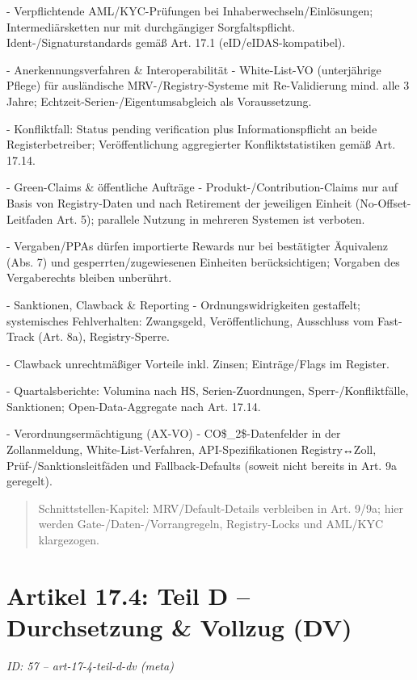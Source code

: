 \documentclass[12pt,a4paper]{scrartcl}
\begin{document}
- Verpflichtende AML/KYC-Prüfungen bei Inhaberwechseln/Einlösungen; Intermediärsketten nur mit durchgängiger Sorgfaltspflicht. Ident-/Signaturstandards gemäß Art. 17.1 (eID/eIDAS-kompatibel).

- Anerkennungsverfahren \& Interoperabilität
- White-List-VO (unterjährige Pflege) für ausländische MRV-/Registry-Systeme mit Re-Validierung mind. alle 3 Jahre; Echtzeit-Serien-/Eigentumsabgleich als Voraussetzung.

- Konfliktfall: Status pending verification plus Informationspflicht an beide Registerbetreiber; Veröffentlichung aggregierter Konfliktstatistiken gemäß Art. 17.14.

- Green-Claims \& öffentliche Aufträge
- Produkt-/Contribution-Claims nur auf Basis von Registry-Daten und nach Retirement der jeweiligen Einheit (No-Offset-Leitfaden Art. 5); parallele Nutzung in mehreren Systemen ist verboten.

- Vergaben/PPAs dürfen importierte Rewards nur bei bestätigter Äquivalenz (Abs. 7) und gesperrten/zugewiesenen Einheiten berücksichtigen; Vorgaben des Vergaberechts bleiben unberührt.

- Sanktionen, Clawback \& Reporting
- Ordnungswidrigkeiten gestaffelt; systemisches Fehlverhalten: Zwangsgeld, Veröffentlichung, Ausschluss vom Fast-Track (Art. 8a), Registry-Sperre.

- Clawback unrechtmäßiger Vorteile inkl. Zinsen; Einträge/Flags im Register.

- Quartalsberichte: Volumina nach HS, Serien-Zuordnungen, Sperr-/Konfliktfälle, Sanktionen; Open-Data-Aggregate nach Art. 17.14.

- Verordnungsermächtigung (AX-VO)
- CO\$\_2\$-Datenfelder in der Zollanmeldung, White-List-Verfahren, API-Spezifikationen Registry↔Zoll, Prüf-/Sanktionsleitfäden und Fallback-Defaults (soweit nicht bereits in Art. 9a geregelt).

{\footnotesize\begin{quote}
Schnittstellen-Kapitel: MRV/Default-Details verbleiben in Art. 9/9a; hier werden Gate-/Daten-/Vorrangregeln, Registry-Locks und AML/KYC klargezogen.
\end{quote}}



\section[Artikel 17.4: Teil D -- Durchsetzung \& Vollzug (DV)]{Artikel 17.4: Teil D -- Durchsetzung \& Vollzug (DV)}
\noindent\textit{ID: 57 -- art-17-4-teil-d-dv (meta)}
\end{document}
